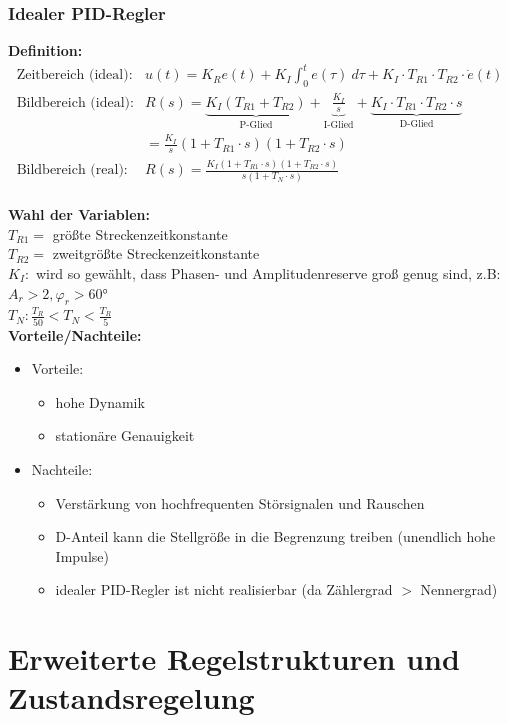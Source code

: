 \documentclass[10pt,a4paper]{article}
\begin{document}
\subsubsection{Idealer PID-Regler}
\textbf{Definition:}
$$
	\begin{array}{ll}
	\text{Zeitbereich (ideal):} & u(t) = K_R e(t) + K_I \int_0^t e(\tau) ~d\tau + K_I ⋅ T_{R1} ⋅ T_{R2} ⋅ \dot e(t)\\
	\text{Bildbereich (ideal):} & R(s) = \underbrace{K_I(T_{R1} + T_{R2})}_{\text{P-Glied}} + \underbrace{\frac{K_I}{s}}_{\text{I-Glied}} + \underbrace{K_I ⋅ T_{R1} ⋅ T_{R2} ⋅ s}_{\text{D-Glied}} \\
	& = \frac{K_I}{s}(1 + T_{R1} ⋅ s)(1 + T_{R2} ⋅ s) \\
	\text{Bildbereich (real):} & R(s) = \frac{K_I(1 + T_{R1} ⋅ s)(1 + T_{R2} ⋅ s)}{s(1 + T_N ⋅ s)}
	\end{array}
$$ \\


\textbf{Wahl der Variablen:} \\
$T_{R1} =$ größte Streckenzeitkonstante  \\
$T_{R2} =$ zweitgrößte Streckenzeitkonstante \\
$K_I:$ wird so gewählt, dass Phasen- und Amplitudenreserve groß genug sind, z.B: $A_r > 2, \varphi_r > 60°$ \\
$T_N: \frac{T_R}{50} < T_N < \frac{T_R}{5}$ \\

\textbf{Vorteile/Nachteile:}
\begin{itemize}
	\item Vorteile:
	\begin{itemize}
		\item hohe Dynamik
		\item stationäre Genauigkeit
	\end{itemize}
	\item Nachteile:
	\begin{itemize}
		\item Verstärkung von hochfrequenten Störsignalen und Rauschen
		\item D-Anteil kann die Stellgröße in die Begrenzung treiben (unendlich hohe Impulse)
		\item idealer PID-Regler ist nicht realisierbar (da Zählergrad $>$ Nennergrad)
	\end{itemize}
\end{itemize}

\section{Erweiterte Regelstrukturen und Zustandsregelung}
\end{document}
